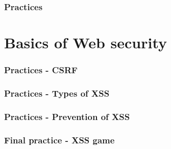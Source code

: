 \documentclass[english,10pt]{book}
\newif\ifSOLS
\begin{document}
\subsection{Practices}



\chapter{Basics of Web security\label{chap:web-sec}}




\subsection{Practices - CSRF}



\subsection{Practices - Types  of XSS}






\subsection{Practices - Prevention of XSS}


\subsection{Final practice - XSS game}


\ifSOLS
\chapter{Answers to Practices}
\shipoutExercise
\vspace{0.5cm}
\shipoutAnswer
\fi


%
% 
\end{document}
